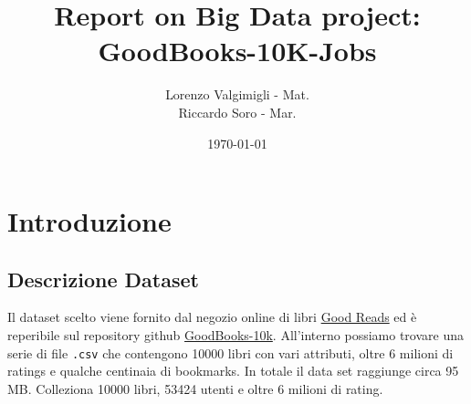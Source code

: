 \documentclass[11pt]{article}
\title{\textbf{Report on Big Data project: GoodBooks-10K-Jobs}}
\author{
Lorenzo Valgimigli - Mat.\\
Riccardo Soro - Mar. }
\date{\today}
\begin{document}
\maketitle
\newpage

\tableofcontents

\newpage

\section{Introduzione}
\subsection{Descrizione Dataset}

Il dataset scelto viene fornito dal negozio online di libri \href{https://www.goodreads.com/}{Good Reads} ed è
reperibile sul repository github \href{https://github.com/zygmuntz/goodbooks-10k}{GoodBooks-10k}.
All'interno possiamo trovare una serie di file \texttt{.csv} che contengono 10000 libri con vari attributi,
oltre 6 milioni di ratings e qualche centinaia di bookmarks.
In totale il data set raggiunge circa 95 MB. Colleziona 10000 libri, 53424 utenti e
oltre 6 milioni di rating.
\end{document}
